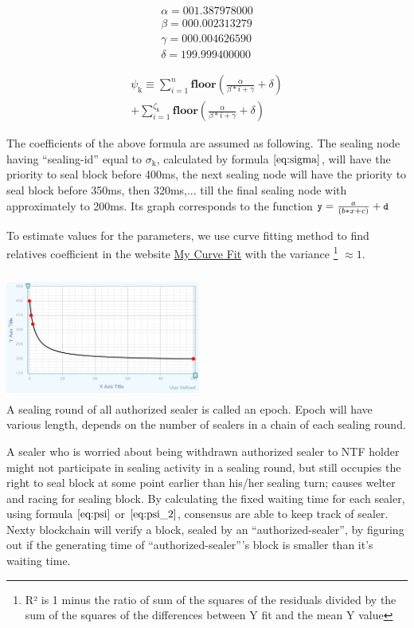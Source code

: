 \documentclass[12pt,oneside]{amsart}
\begin{document}
\begin{multicols}{2}
\begin{eqnarray}
\alpha = 001.387978000 \\
\beta = 000.002313279 \\
\gamma = 000.004626590 \\
\delta = 199.999400000
\end{eqnarray}

\begin{multline}\label{eq:psi_2}
\psi_{\mathrm{k}} \equiv \sum_{i=1}^{n} \mathbf{floor}(\frac{\alpha}{\beta*i+\gamma} + \delta) \\ 
+ \sum_{i=1}^{\zeta_\mathrm{k}} \mathbf{floor}(\frac{\alpha}{\beta*i+\gamma} + \delta)
\end{multline}

The coefficients of the above formula are assumed as following. The sealing node having ``sealing-id'' equal to $\sigma_{\mathrm{k}}$, calculated by formula $\eqref{eq:sigma}$, will have the priority to seal block before 400ms, the next sealing node will have the priority to seal block before 350ms, then 320ms,... till the final sealing node with approximately to 200ms. Its graph corresponds to the function $\texttt{\small y} = \frac{a} {(b * x + c)} + \texttt{\small d}$

To estimate values for the parameters, we use curve fitting method to find relatives coefficient in the website \href{https://mycurvefit.com/}{My Curve Fit} with the variance \footnote{R² is 1 minus the ratio of sum of the squares of the residuals divided by the sum of the squares of the differences between Y fit and the mean Y value} $\approx 1$.
\\
\\
\includegraphics[width=0.48\textwidth, height=4cm]{curve-fit}
\\
A sealing round of all authorized sealer is called an epoch. Epoch will have various length, depends on the number of sealers in a chain of each sealing round.

A sealer who is worried about being withdrawn authorized sealer to {\small NTF} holder might not participate in sealing activity in a sealing round, but still occupies the right to seal block at some point earlier than his/her sealing turn; causes welter and racing for sealing block. By calculating the fixed waiting time for each sealer, using formula $\eqref{eq:psi}$ or $\eqref{eq:psi_2}$, consensus are able to keep track of sealer. Nexty blockchain will verify a block, sealed by an ``authorized-sealer'', by figuring out if the generating time of ``authorized-sealer''’s block is smaller than it's waiting time. 


\end{multicols}
\end{document}
